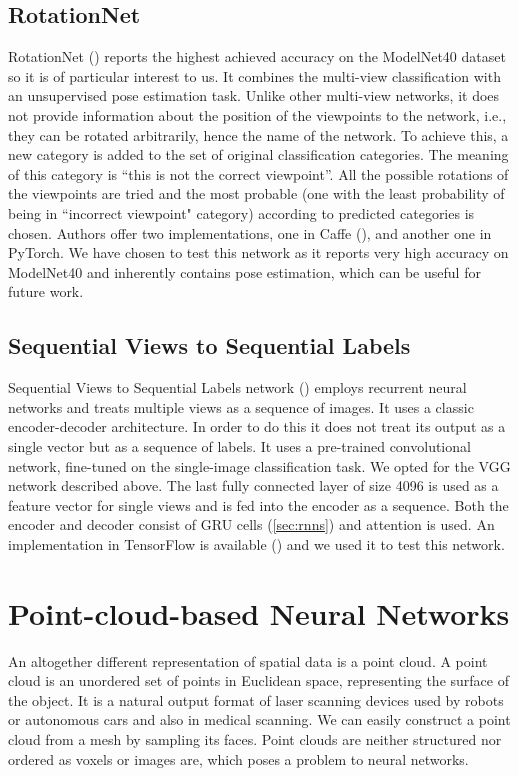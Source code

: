 

\subsection{RotationNet}
RotationNet (\cite{kanezaki_rotationnet:_2018}) reports the highest achieved accuracy on the ModelNet40 dataset so it is of particular interest to us. It combines the multi-view classification with an unsupervised pose estimation task. Unlike other multi-view networks, it does not provide information about the position of the viewpoints to the network, i.e., they can be rotated arbitrarily, hence the name of the network. 
To achieve this, a new category is added to the set of original classification categories. The meaning of this category is ``this is not the correct viewpoint”. All the possible rotations of the viewpoints are tried and the most probable (one with the least probability of being in ``incorrect viewpoint" category) according to predicted categories is chosen. Authors offer two implementations, one in Caffe (\cite{kanezaki_rotationnet_2018}), and another one in PyTorch. We have chosen to test this network as it reports very high accuracy on ModelNet40 and inherently contains pose estimation, which can be useful for future work.

\subsection{Sequential Views to Sequential Labels}
Sequential Views to Sequential Labels network (\cite{zhizhong_seqviews2seqlabels:_2018}) employs recurrent neural networks and treats multiple views as a sequence of images. It uses a classic encoder-decoder architecture. In order to do this it does not treat its output as a single vector but as a sequence of labels. It uses a pre-trained convolutional network, fine-tuned on the single-image classification task. We opted for the VGG network described above. The last fully connected layer of size 4096 is used as a feature vector for single views and is fed into the encoder as a sequence. Both the encoder and decoder consist of GRU cells (\autoref{sec:rnns}) and attention is used. An implementation in TensorFlow is available (\cite{zhizhong_seq2seq_2018}) and we used it to test this network.

\section{Point-cloud-based Neural Networks}
An altogether different representation of spatial data is a point cloud. A point cloud is an unordered set of points in Euclidean space, representing the surface of the object. It is a natural output format of laser scanning devices used by robots or autonomous cars and also in medical scanning. We can easily construct a point cloud from a mesh by sampling its faces. Point clouds are neither structured nor ordered as voxels or images are, which poses a problem to neural networks.

